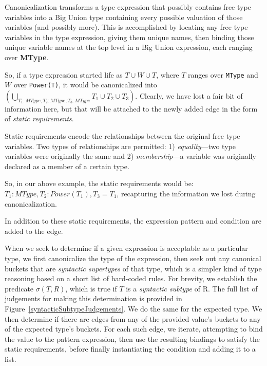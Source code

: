 Canonicalization transforms a type expression that possibly contains free type variables into a Big Union type containing every possible valuation of those variables (and possibly more).  This is accomplished by locating any free type variables in the type expression, giving them unique names, then binding those unique variable names at the top level in a Big Union expression, each ranging over \textbf{MType}.

So, if a type expression started life as $T \cup W \cup T$, where $T$ ranges over \texttt{MType} and $W$ over \texttt{Power(T)}, it would be canonicalized into $\left( \bigcup \limits_{T_1 : MType, T_2 : MType, T_3 : MType} T_1 \cup T_2 \cup T_3 \right)$.  Clearly, we have lost a fair bit of information here, but that will be attached to the newly added edge in the form of \emph{static requirements}.

Static requirements encode the relationships between the original free type variables.  Two types of relationships are permitted: 1) \emph{equality}---two type variables were originally the same and 2) \emph{membership}---a variable was originally declared as a member of a certain type.

So, in our above example, the static requirements would be: $T_1 : MType, T_2 : Power(T_1), T_3 = T_1$, recapturing the information we lost during canonicalization.

In addition to these static requirements, the expression pattern and condition are added to the edge.

When we seek to determine if a given expression is acceptable as a particular type, we first canonicalize the type of the expression, then seek out any canonical buckets that are \emph{syntactic supertypes} of that type, which is a simpler kind of type reasoning based on a short list of hard-coded rules.  For brevity, we establish the predicate $\sigma(T, R)$, which is true if $T$ is a \emph{syntactic subtype} of R.  The full list of judgements for making this determination is provided in Figure~\ref{syntacticSubtypeJudgements}.  We do the same for the expected type.  We then determine if there are edges from any of the provided value's buckets to any of the expected type's buckets.  For each such edge, we iterate, attempting to bind the value to the pattern expression, then use the resulting bindings to satisfy the static requirements, before finally instantiating the condition and adding it to a list.

